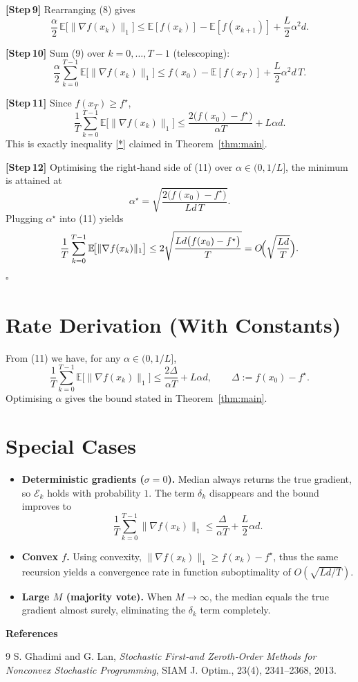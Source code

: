 \documentclass{article}
\newcommand{\E}{\mathbb{E}}
\begin{document}
\noindent\textbf{[Step 9]} Rearranging (8) gives
\[
\frac{\alpha}{2}\,\E\!\bigl[\|\nabla f(x_k)\|_{1}\bigr]
\le \E[f(x_k)]-\E[f(x_{k+1})]+\frac{L}{2}\alpha^{2}d.
\tag{9}
\]

\noindent\textbf{[Step 10]} Sum (9) over $k=0,\dots,T-1$ (telescoping):
\[
\frac{\alpha}{2}\sum_{k=0}^{T-1}\E\!\bigl[\|\nabla f(x_k)\|_{1}\bigr]
\le f(x_0)-\E[f(x_T)]+\frac{L}{2}\alpha^{2}d\,T.
\tag{10}
\]

\noindent\textbf{[Step 11]} Since $f(x_T)\ge f^{\star}$,
\[
\frac{1}{T}\sum_{k=0}^{T-1}\E\!\bigl[\|\nabla f(x_k)\|_{1}\bigr]
\le \frac{2\bigl(f(x_0)-f^{\star}\bigr)}{\alpha T}
+L\alpha d.
\tag{11}
\]
This is exactly inequality \eqref{*} claimed in Theorem~\ref{thm:main}.

\noindent\textbf{[Step 12]} Optimising the right‑hand side of (11) over $\alpha\in(0,1/L]$,
the minimum is attained at
\[
\alpha^{\star}= \sqrt{\frac{2\bigl(f(x_0)-f^{\star}\bigr)}{L d\,T}} .
\]
Plugging $\alpha^{\star}$ into (11) yields
\[
\frac{1}{T}\sum_{k=0}^{T-1}\E\!\bigl[\|\nabla f(x_k)\|_{1}\bigr]
\le 2\sqrt{\frac{L d\bigl(f(x_0)-f^{\star}\bigr)}{T}}
=O\!\Bigl(\sqrt{\frac{L d}{T}}\Bigr).
\]
\hfill $\square$

\section*{Rate Derivation (With Constants)}
From (11) we have, for any $\alpha\in(0,1/L]$,
\[
\boxed{
\frac{1}{T}\sum_{k=0}^{T-1}\E\!\bigl[\|\nabla f(x_k)\|_{1}\bigr]
\le \frac{2\Delta}{\alpha T}+L\alpha d,
}
\qquad \Delta:=f(x_0)-f^{\star}.
\]
Optimising $\alpha$ gives the bound stated in Theorem~\ref{thm:main}.

\section*{Special Cases}
\begin{itemize}
\item \textbf{Deterministic gradients ($\sigma=0$).}
Median always returns the true gradient, so $\mathcal{E}_k$ holds with
probability $1$.  The term $\delta_k$ disappears and the bound improves to
\[
\frac{1}{T}\sum_{k=0}^{T-1}\|\nabla f(x_k)\|_{1}
\le \frac{\Delta}{\alpha T}+ \frac{L}{2}\alpha d .
\]

\item \textbf{Convex $f$.}
Using convexity, $ \|\nabla f(x_k)\|_{1}\ge f(x_k)-f^{\star}$, thus the same
recursion yields a convergence rate in function suboptimality of
$O(\sqrt{Ld/T})$.

\item \textbf{Large $M$ (majority vote).}
When $M\to\infty$, the median equals the true gradient almost surely,
eliminating the $\delta_k$ term completely.
\end{itemize}

\bigskip
\noindent\textbf{References}
\begin{thebibliography}{9}
S. Ghadimi and G. Lan, \emph{Stochastic First‑and Zeroth‑Order Methods for Nonconvex Stochastic Programming}, SIAM J. Optim., 23(4), 2341–2368, 2013.
\end{thebibliography}
\end{document}
